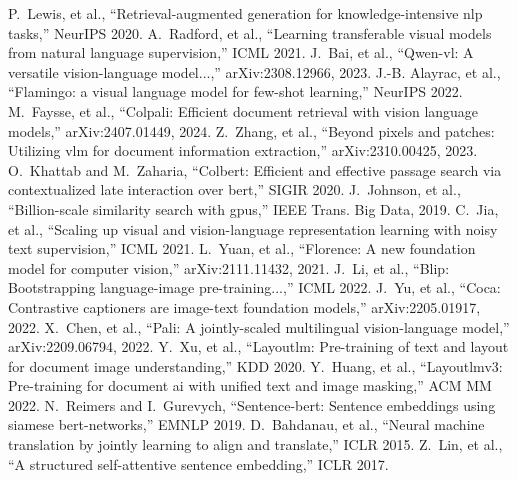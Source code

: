 \small
\begin{thebibliography}{1}

 P.~Lewis, et al., ``Retrieval-augmented generation for knowledge-intensive nlp tasks,'' NeurIPS 2020.
 A.~Radford, et al., ``Learning transferable visual models from natural language supervision,'' ICML 2021.
 J.~Bai, et al., ``Qwen-vl: A versatile vision-language model...,'' arXiv:2308.12966, 2023.
 J.-B. Alayrac, et al., ``Flamingo: a visual language model for few-shot learning,'' NeurIPS 2022.
 M.~Faysse, et al., ``Colpali: Efficient document retrieval with vision language models,'' arXiv:2407.01449, 2024.
 Z.~Zhang, et al., ``Beyond pixels and patches: Utilizing vlm for document information extraction,'' arXiv:2310.00425, 2023.
 O.~Khattab and M.~Zaharia, ``Colbert: Efficient and effective passage search via contextualized late interaction over bert,'' SIGIR 2020.
 J.~Johnson, et al., ``Billion-scale similarity search with gpus,'' IEEE Trans. Big Data, 2019.
 C.~Jia, et al., ``Scaling up visual and vision-language representation learning with noisy text supervision,'' ICML 2021.
 L.~Yuan, et al., ``Florence: A new foundation model for computer vision,'' arXiv:2111.11432, 2021.
 J.~Li, et al., ``Blip: Bootstrapping language-image pre-training...,'' ICML 2022.
 J.~Yu, et al., ``Coca: Contrastive captioners are image-text foundation models,'' arXiv:2205.01917, 2022.
 X.~Chen, et al., ``Pali: A jointly-scaled multilingual vision-language model,'' arXiv:2209.06794, 2022.
 Y.~Xu, et al., ``Layoutlm: Pre-training of text and layout for document image understanding,'' KDD 2020.
 Y.~Huang, et al., ``Layoutlmv3: Pre-training for document ai with unified text and image masking,'' ACM MM 2022.
 N.~Reimers and I.~Gurevych, ``Sentence-bert: Sentence embeddings using siamese bert-networks,'' EMNLP 2019.
 D.~Bahdanau, et al., ``Neural machine translation by jointly learning to align and translate,'' ICLR 2015.
 Z.~Lin, et al., ``A structured self-attentive sentence embedding,'' ICLR 2017.

\end{thebibliography}
